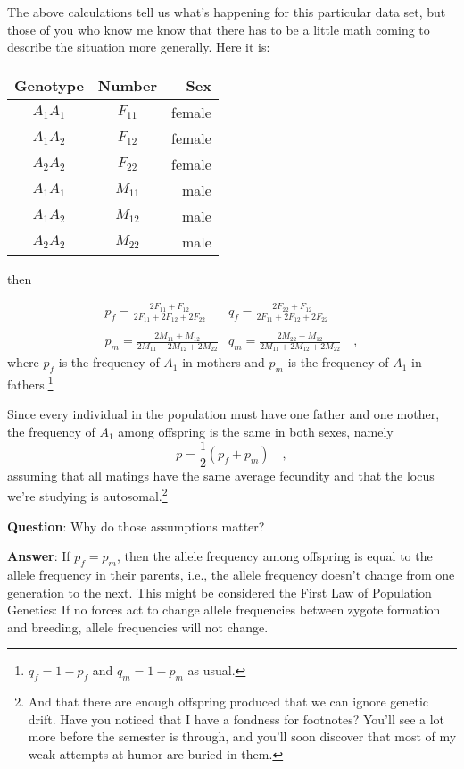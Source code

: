 \documentclass[12pt]{article}
\begin{document}
The above calculations tell us what's happening for this particular
data set, but those of you who know me know that there has to be a
little math coming to describe the situation more generally. Here it
is: 

\begin{center}
\begin{tabular}{ccr}
\hline\hline
Genotype & Number & Sex \\
\hline
$A_1A_1$ & $F_{11}$ & female \\
$A_1A_2$ & $F_{12}$ & female \\
$A_2A_2$ & $F_{22}$ & female \\
$A_1A_1$ & $M_{11}$ & male \\
$A_1A_2$ & $M_{12}$ & male \\
$A_2A_2$ & $M_{22}$ & male \\
\hline
\end{tabular}
\end{center}

\noindent then

$$\begin{array}{cc}
p_f = \frac{2F_{11}+F_{12}}{2F_{11}+2F_{12}+2F_{22}} &
q_f = \frac{2F_{22}+F_{12}}{2F_{11}+2F_{12}+2F_{22}} \\
 & \\
p_m = \frac{2M_{11}+M_{12}}{2M_{11}+2M_{12}+2M_{22}} &
q_m = \frac{2M_{22}+M_{12}}{2M_{11}+2M_{12}+2M_{22}} \quad ,
\end{array}$$
where $p_f$ is the frequency of $A_1$ in mothers and $p_m$ is the
frequency of $A_1$ in fathers.\footnote{$q_f = 1 - p_f$ and $q_m = 1 -
  p_m$ as usual.}

Since every individual in the population must have one father and one
mother, the frequency of $A_1$ among offspring is the same in both
sexes, namely
\[
p = \frac{1}{2}(p_f + p_m) \quad ,
\]
assuming that all matings have the same average fecundity and that the
locus we're studying is autosomal.\footnote{And that there are enough
  offspring produced that we can ignore genetic drift. Have you
  noticed that I have a fondness for footnotes? You'll see a lot more
  before the semester is through, and you'll soon discover that most
  of my weak attempts at humor are buried in them.}

{\bf Question}: Why do those assumptions matter?

{\bf Answer}: If $p_f = p_m$, then the allele frequency among offspring
is equal to the allele frequency in their parents, i.e., the allele
frequency doesn't change from one generation to the next. This might
be considered the First Law of Population Genetics: If no forces act
to change allele frequencies between zygote formation and breeding,
allele frequencies will not change.
\end{document}
